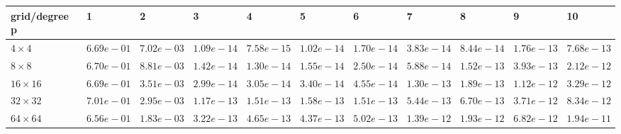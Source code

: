 \begin{tabular}{lllllllllll}
\hline
 grid/degree p   & 1          & 2          & 3          & 4          & 5          & 6          & 7          & 8          & 9          & 10         \\
\hline
 $4 \times 4$    & $6.69e-01$ & $7.02e-03$ & $1.09e-14$ & $7.58e-15$ & $1.02e-14$ & $1.70e-14$ & $3.83e-14$ & $8.44e-14$ & $1.76e-13$ & $7.68e-13$ \\
 $8 \times 8$    & $6.70e-01$ & $8.81e-03$ & $1.42e-14$ & $1.30e-14$ & $1.55e-14$ & $2.50e-14$ & $5.88e-14$ & $1.52e-13$ & $3.93e-13$ & $2.12e-12$ \\
 $16 \times 16$  & $6.69e-01$ & $3.51e-03$ & $2.99e-14$ & $3.05e-14$ & $3.40e-14$ & $4.55e-14$ & $1.30e-13$ & $1.89e-13$ & $1.12e-12$ & $3.29e-12$ \\
 $32 \times 32$  & $7.01e-01$ & $2.95e-03$ & $1.17e-13$ & $1.51e-13$ & $1.58e-13$ & $1.51e-13$ & $5.44e-13$ & $6.70e-13$ & $3.71e-12$ & $8.34e-12$ \\
 $64 \times 64$  & $6.56e-01$ & $1.83e-03$ & $3.22e-13$ & $4.65e-13$ & $4.37e-13$ & $5.02e-13$ & $1.39e-12$ & $1.93e-12$ & $6.82e-12$ & $1.94e-11$ \\
\hline
\end{tabular}